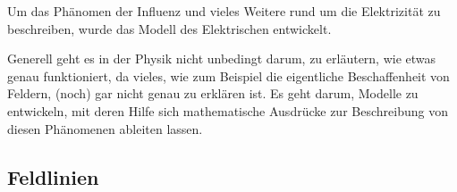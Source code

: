 




%
%	





Um das Phänomen der Influenz und vieles Weitere rund um die Elektrizität zu beschreiben, wurde das Modell des Elektrischen entwickelt. 

\begin{NiceToKnow}
Generell geht es in der Physik nicht unbedingt darum, zu erläutern, wie etwas genau funktioniert, da vieles, wie zum Beispiel die eigentliche Beschaffenheit von Feldern, (noch) gar nicht genau zu erklären ist. Es geht darum, Modelle zu entwickeln, mit deren Hilfe sich mathematische Ausdrücke zur Beschreibung von diesen Phänomenen ableiten lassen.
\end{NiceToKnow}


\subsection{Feldlinien}

